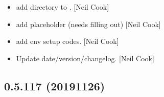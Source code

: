 \documentclass[a4paper,10pt,english]{report}
\begin{document}
\begin{itemize}
\item {} 
 \sphinxhyphen{} add directory to . {[}Neil Cook{]}

\item {} 
 \sphinxhyphen{} add placeholder (needs filling out) {[}Neil
Cook{]}

\item {} 
 \sphinxhyphen{} add env setup codes. {[}Neil Cook{]}

\item {} 
Update date/version/changelog. {[}Neil Cook{]}

\end{itemize}


\subsection{0.5.117 (2019\sphinxhyphen{}11\sphinxhyphen{}26)}
\end{document}
